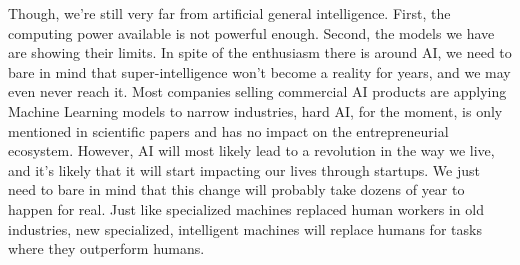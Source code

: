 \documentclass[12pt]{article}
\begin{document}
Though, we're still very far from artificial general intelligence. First, the
computing power available is not powerful enough. Second, the models we have are
showing their limits. In spite of the enthusiasm there is around AI, we need to
bare in mind that super-intelligence won't become a reality for years, and we
may even never reach it. Most companies selling commercial AI products are
applying Machine Learning models to narrow industries, hard AI, for the moment,
is only mentioned in scientific papers and has no impact on the entrepreneurial
ecosystem. However, AI will most likely lead to a revolution in the  way we
live, and it's likely that it will start impacting our lives through  startups.
We just need to bare in mind that this change will probably take dozens  of year
to happen for real. Just like specialized machines replaced human workers in old
industries,  new specialized, intelligent machines will replace humans for tasks
where they outperform humans.


\pagebreak

\printglossaries
\pagebreak

\end{document}
